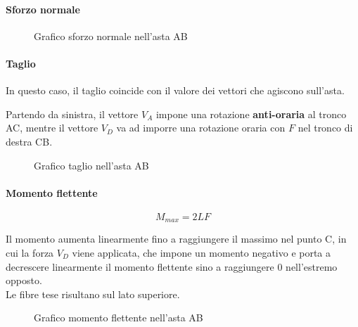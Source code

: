 \documentclass[main.tex]{subfiles}
\begin{document}
\paragraph{Sforzo normale}

\begin{figure}[H]
\centering
\resizebox{.3\textwidth}{!}{}
\caption{Grafico sforzo normale nell'asta AB}
\end{figure}

\paragraph{Taglio}
In questo caso, il taglio coincide con il valore dei vettori che agiscono sull'asta.

Partendo da sinistra, il vettore $V_A$ impone una rotazione \textbf{anti-oraria} al tronco AC, mentre il vettore $V_D$ va ad imporre una rotazione oraria con $F$ nel tronco di destra CB.

\begin{figure}[H]
\centering
\resizebox{.3\textwidth}{!}{}
\caption{Grafico taglio nell'asta AB}
\end{figure}

\paragraph{Momento flettente}

\[
	M_{max} = 2LF
\]

Il momento aumenta linearmente fino a raggiungere il massimo nel punto C, in cui la forza $V_D$ viene applicata, che impone un momento negativo e porta a decrescere linearmente il momento flettente sino a raggiungere 0 nell'estremo opposto.
\\
Le fibre tese risultano sul lato superiore.

\begin{figure}[H]
\centering
\resizebox{.3\textwidth}{!}{}
\caption{Grafico momento flettente nell'asta AB}
\end{figure}
\end{document}

